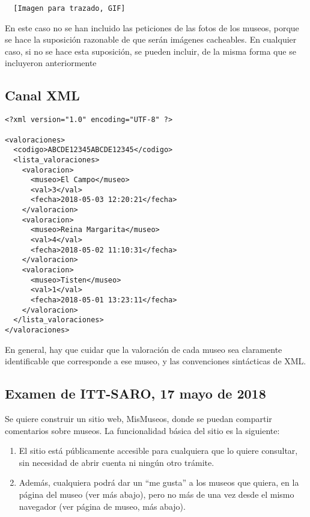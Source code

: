 {\begin{itemize}
\begin{verbatim}
  [Imagen para trazado, GIF]
\end{verbatim}

\end{itemize}

En este caso no se han incluido las peticiones de las fotos de los museos, porque se hace la suposición razonable de que serán imágenes cacheables. En cualquier caso, si no se hace esta suposición, se pueden incluir, de la misma forma que se incluyeron anteriormente

\subsection*{Canal XML}


\begin{verbatim}
<?xml version="1.0" encoding="UTF-8" ?>

<valoraciones>
  <codigo>ABCDE12345ABCDE12345</codigo>
  <lista_valoraciones>
    <valoracion>
      <museo>El Campo</museo>
      <val>3</val>
      <fecha>2018-05-03 12:20:21</fecha>
    </valoracion>
    <valoracion>
      <museo>Reina Margarita</museo>
      <val>4</val>
      <fecha>2018-05-02 11:10:31</fecha>
    </valoracion>
    <valoracion>
      <museo>Tisten</museo>
      <val>1</val>
      <fecha>2018-05-01 13:23:11</fecha>
    </valoracion>
  </lista_valoraciones>
</valoraciones>
\end{verbatim}

En general, hay que cuidar que la valoración de cada museo sea claramente identificable que corresponde a ese museo, y las convenciones sintácticas de XML.


\subsection{Examen de ITT-SARO, 17 mayo de 2018}


Se quiere construir un sitio web, MisMuseos, donde se puedan compartir comentarios sobre museos. La funcionalidad básica del sitio es la siguiente:

\begin{enumerate}
\item El sitio está públicamente accesible para cualquiera que lo quiere consultar, sin necesidad de abrir cuenta ni ningún otro trámite.

\item Además, cualquiera podrá dar un ``me gusta'' a los museos que quiera, en la página del museo (ver más abajo), pero no más de una vez desde el mismo navegador (ver página de museo, más abajo).


\end{enumerate}}
